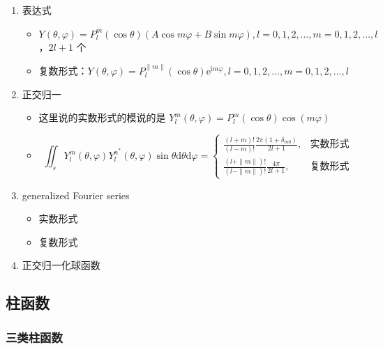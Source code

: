 \documentclass{article}
\begin{document}
\begin{enumerate}
    \item 表达式 \begin{itemize}
        \item $Y(\theta, \varphi)=P^m_l(\cos\theta)(A\cos m\varphi+B\sin m\varphi), l=0, 1, 2, \dots, m=0, 1, 2, \dots,l$，$2l+1$ 个
        \item 复数形式：$Y(\theta, \varphi)=P^{\|m\|}_l(\cos\theta)\mathrm{e}^{\mathrm{i}m\varphi}, l=0, 1, 2, \dots, m=0, 1, 2, \dots,l$
    \end{itemize}
    \item 正交归一 \begin{itemize}
        \item 这里说的实数形式的模说的是 $Y^m_l(\theta, \varphi)=P^m_l(\cos\theta)\cos(m\varphi)$
        \item $$\iint_sY^m_l(\theta, \varphi)Y^{n^*}_l(\theta, \varphi)\sin\theta\mathrm{d}\theta\mathrm{d}\varphi=
        \begin{cases}\frac{(l+m)!}{(l-m)!}\frac{2\pi(1+\delta_{m0})}{2l+1}, &\text{实数形式}\\
        \frac{(l+\|m\|)!}{(l-\|m\|)!}\frac{4\pi}{2l+1},&\text{复数形式}
        \end{cases}$$
    \end{itemize}
    \item generalized Fourier series \begin{itemize}
        \item 实数形式
        \item 复数形式
    \end{itemize}
    \item 正交归一化球函数
\end{enumerate}

\subsection{柱函数}

\subsubsection{三类柱函数}
\end{document}
